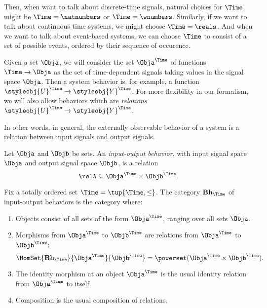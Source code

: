 Then, when want to talk about discrete-time signals, natural choices for $\Time$ might be $\Time = \natnumbers$ or $\Time = \wnumbers$. Similarly, if we want to talk about continuous time systems, we might choose $\Time = \reals$.
And when we want to talk about event-based systems, we can choose $\Time$ to consist of a set of possible events, ordered by their sequence of occurence.


Given a set $\Obja$, we will consider the set $\Obja^\Time$ of functions $\Time \to \Obja$ as the set of time-dependent signals taking values in the signal space $\Obja$. Then a system behavior is, for example, a function $\styleobj{U}^\Time \to \styleobj{Y}^\Time$. For more flexibility in our formalism, we will also allow behaviors which are \emph{relations} $\styleobj{U}^\Time \to \styleobj{Y}^\Time$. 

In other words, in general, the externally observable behavior of a system is a relation between input signals and output signals.

\begin{definition}
    Let $\Obja$ and $\Objb$ be sets.
    An \emph{input-output behavior}, with input signal space $\Obja$ and output signal space $\Objb$, is a relation
    \begin{equation}
        \relA \subseteq \Obja^\Time \times \Objb^\Time.
    \end{equation}
\end{definition}

\begin{definition}
    Fix a totally ordered set $\Time = \tup{\Time, \leq}$.
    The category $\textbf{Bh}_\Time$ of input-output behaviors is the category where:
    \begin{enumerate}
        \item Objects consist of all sets of the form $\Obja^\Time$, ranging over all sets $\Obja$.
        \item Morphisms from $\Obja^\Time$ to $\Objb^\Time$ are relations from $\Obja^\Time$ to $\Objb^\Time$:
              \begin{equation}
                  \HomSet{\textbf{Bh}_\Time}{\Obja^\Time}{\Objb^\Time} = \powerset (\Obja^\Time \times \Objb^\Time).
              \end{equation}
        \item The identity morphism at an object $\Obja^\Time$ is the usual identity relation from $\Obja^\Time$ to itself.
        \item Composition is the usual composition of relations.
    \end{enumerate}
\end{definition}

